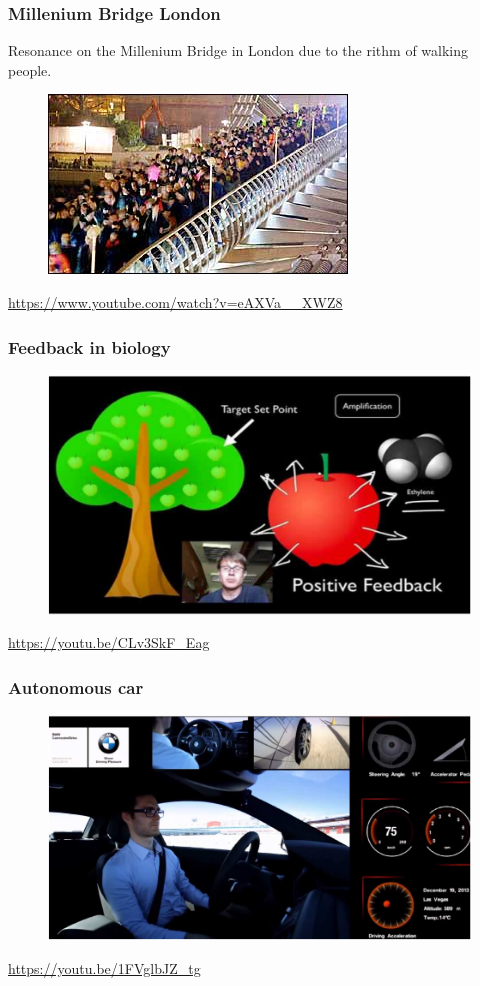 \documentclass{beamer}
\begin{document}
\begin{frame}
\frametitle{Millenium Bridge London}
Resonance on the Millenium Bridge in London due to the rithm of walking people.
\begin{figure}
\includegraphics[scale=0.9]{Millenium_bridge}
\end{figure}
\url{https://www.youtube.com/watch?v=eAXVa__XWZ8}
\end{frame}


\begin{frame}
\frametitle{Feedback in biology}
\begin{figure}
\includegraphics[scale=0.5]{feedback_biology}
\end{figure}
\url{https://youtu.be/CLv3SkF_Eag}
\end{frame}


\begin{frame}
\frametitle{Autonomous car}
\begin{figure}
\includegraphics[scale=0.28]{autonomous_car}
\end{figure}
\url{https://youtu.be/1FVglbJZ_tg}
\end{frame}
\end{document}
